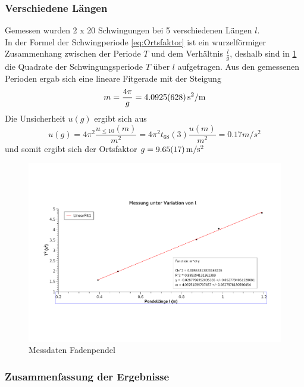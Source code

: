\documentclass[
	a4paper,
	12pt,
	pagesize,
	ngerman
]{scrartcl}
\begin{document}
	\subsubsection{Verschiedene Längen}
	Gemessen wurden 2 x 20 Schwingungen bei 5 verschiedenen Längen $l$. \\
	In der Formel der Schwingperiode \eqref{eq:Ortsfaktor} ist ein wurzelförmiger Zusammenhang zwischen der Periode $T$ und dem Verhältnis $\frac{l}{g}$, deshalb sind in \cref{Messdaten} die Quadrate der Schwingungsperiode $T$ über $l$ aufgetragen. Aus den gemessenen Perioden ergab sich eine lineare Fitgerade mit der Steigung %
	\begin{equation*} 
		m = \frac{4\pi}{g} = \SI{4.0925 +- 0.0628 }{s^2/m}  
	\end{equation*}
	Die Unsicherheit $u(g)$ ergibt sich aus
	\begin{equation*}
		u(g) = 4\pi^2\frac{u_{\leq10}(m)}{m^2} = 4\pi^2t_{68}(3)\frac{u(m)}{m^2} = 0.17 \si{m/s^2}
	\end{equation*}
	und somit ergibt sich der Ortsfaktor  $g = \SI{9.65  +- 0.17}{m/s^2}$


	\begin{figure}[htb]
		\includegraphics[width=1\textwidth]{Graph}
		\centering
		\caption{Messdaten Fadenpendel}
		\label{Messdaten}
		\centering
	\end{figure}

	\subsubsection{Zusammenfassung der Ergebnisse}
	
\end{document}

